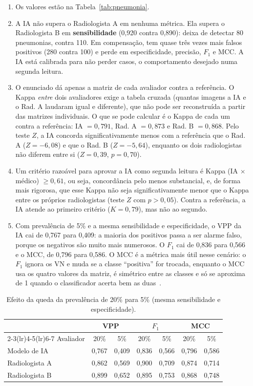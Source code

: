 \documentclass[12pt,a4paper]{article}
\begin{document}
\begin{enumerate}
  \item Os valores estão na Tabela~\ref{tab:pneumonia}.
  \item A IA não supera o Radiologista A em nenhuma métrica. Ela supera o Radiologista B em \textbf{sensibilidade} (0,920 contra 0,890): deixa de detectar 80 pneumonias, contra 110. Em compensação, tem quase três vezes mais falsos positivos (280 contra 100) e perde em especificidade, precisão, $F_1$ e MCC. A IA está calibrada para não perder casos, o comportamento desejado numa segunda leitura.
  \item O enunciado dá apenas a matriz de cada avaliador contra a referência. O Kappa \emph{entre} dois avaliadores exige a tabela cruzada (quantas imagens a IA e o Rad. A laudaram igual e diferente), que não pode ser reconstruída a partir das matrizes individuais. O que se pode calcular é o Kappa de cada um contra a referência: IA $= 0{,}791$, Rad. A $= 0{,}873$ e Rad. B $= 0{,}868$. Pelo teste $Z$, a IA concorda significativamente menos com a referência que o Rad. A ($Z = -6{,}08$) e que o Rad. B ($Z = -5{,}64$), enquanto os dois radiologistas não diferem entre si ($Z = 0{,}39$, $p = 0{,}70$).
  \item Um critério razoável para aprovar a IA como segunda leitura é Kappa (IA $\times$ médico) $\ge 0{,}61$, ou seja, concordância pelo menos substancial, e, de forma mais rigorosa, que esse Kappa não seja significativamente menor que o Kappa entre os próprios radiologistas (teste $Z$ com $p > 0{,}05$). Contra a referência, a IA atende ao primeiro critério ($K = 0{,}79$), mas não ao segundo.
  \item Com prevalência de 5\% e a mesma sensibilidade e especificidade, o VPP da IA cai de 0,767 para 0,409: a maioria dos positivos passa a ser alarme falso, porque os negativos são muito mais numerosos. O $F_1$ cai de 0,836 para 0,566 e o MCC, de 0,796 para 0,586. O MCC é a métrica mais útil nesse cenário: o $F_1$ ignora os VN e muda se a classe ``positiva'' for trocada, enquanto o MCC usa os quatro valores da matriz, é simétrico entre as classes e só se aproxima de 1 quando o classificador acerta bem as duas~\cite{chicco}.
\end{enumerate}

\begin{table}[H]
\centering
\caption{Efeito da queda da prevalência de 20\% para 5\% (mesma sensibilidade e especificidade).}
\label{tab:prevalencia}
\begin{tabular}{lcccccc}
\toprule
 & \multicolumn{2}{c}{VPP} & \multicolumn{2}{c}{$F_1$} & \multicolumn{2}{c}{MCC} \\
\cmidrule(lr){2-3}\cmidrule(lr){4-5}\cmidrule(lr){6-7}
Avaliador & 20\% & 5\% & 20\% & 5\% & 20\% & 5\% \\
\midrule
Modelo de IA   & 0,767 & 0,409 & 0,836 & 0,566 & 0,796 & 0,586 \\
Radiologista A & 0,862 & 0,569 & 0,900 & 0,709 & 0,874 & 0,714 \\
Radiologista B & 0,899 & 0,652 & 0,895 & 0,753 & 0,868 & 0,748 \\
\bottomrule
\end{tabular}
\end{table}
\end{document}
